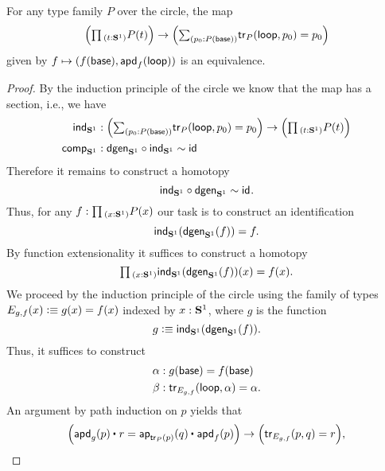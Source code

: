 \begin{thm}\label{thm:circle-dependent-universal-property}
  For any type family $P$ over the circle, the map
  \begin{equation*}
    \Big(\prd{t:\sphere{1}}P(t)\Big)
    \to
    \Big(\sm{p_0:P(\base)}\tr_P(\lloop,p_0)=p_0\Big)
  \end{equation*}
  given by $f\mapsto(f(\mathsf{base}),\mathsf{apd}_{f}\mathopen{}\left(\mathsf{loop}\right)\mathclose{})$ is an equivalence.
\end{thm}

\begin{proof}
  By the induction principle of the circle we know that the map has a section, i.e., we have
  \begin{align*}
    \ind{\sphere{1}} & : \Big(\sm{p_0:P(\base)}\tr_P(\lloop,p_0)=p_0\Big) \to \Big(\prd{t:\sphere{1}}P(t)\Big) \\
    \comphtpy{\sphere{1}} & : \dgen_{\sphere{1}}\circ\ind{\sphere{1}}\htpy\idfunc
  \end{align*}
  Therefore it remains to construct a homotopy
  \begin{equation*}
    \mathsf{ind}_{\mathbf{S}^{1}}\circ\mathsf{dgen}_{\mathbf{S}^{1}}\sim\mathsf{id}_{}.
  \end{equation*}
  Thus, for any $f:\prd{x:\sphere{1}}P(x)$ our task is to construct an identification
  \begin{equation*}
    \mathsf{ind}_{\mathbf{S}^{1}}(\mathsf{dgen}_{\mathbf{S}^{1}}(f))=f.
  \end{equation*}
  By function extensionality it suffices to construct a homotopy
  \begin{equation*}
    \prd{x:\sphere{1}} \ind{\sphere{1}}(\dgen_{\sphere{1}}(f))(x)= f(x).
  \end{equation*}
  We proceed by the induction principle of the circle using the family of types $E_{g,f}(x)\vcentcolon\equiv g(x)=f(x)$ indexed by $x:\mathbf{S}^{1}$, where $g$ is the function
  \begin{equation*}
    g\vcentcolon\equiv\mathsf{ind}_{\mathbf{S}^{1}}(\mathsf{dgen}_{\mathbf{S}^{1}}(f)).
  \end{equation*}
  Thus, it suffices to construct
  \begin{align*}
    \alpha & : g(\mathsf{base})=f(\mathsf{base})\\
    \beta  & : \mathsf{tr}_{E_{g,f}}(\mathsf{loop},\alpha)=\alpha. 
  \end{align*}
  An argument by path induction on $p$ yields that
  \begin{equation*}
    \Big(\ct{\apd{g}{p}}{r}=\ct{\ap{\tr_P(p)}{q}}{\apd{f}{p}}\Big)\to\Big(\tr_{E_{g,f}}(p,q)=r\Big),
  \end{equation*}

\end{proof}
